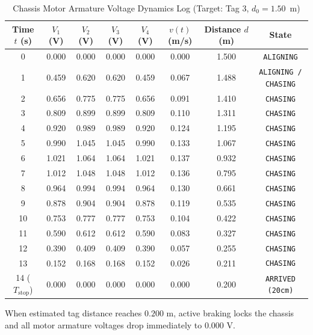\documentclass[10pt,a4paper]{article}
\begin{document}
\begin{table}[h!]
\centering
\caption{Chassis Motor Armature Voltage Dynamics Log (Target: Tag 3, $d_0 = 1.50$~m)}
\label{tab:table1}
\vspace{0.15cm}
\small
\begin{tabular}{c c c c c c c c}
\toprule
\textbf{Time $t$ (s)} & \textbf{$V_1$ (V)} & \textbf{$V_2$ (V)} & \textbf{$V_3$ (V)} & \textbf{$V_4$ (V)} & \textbf{$v(t)$ (m/s)} & \textbf{Distance $d$ (m)} & \textbf{State} \\
\midrule
0  & 0.000 & 0.000 & 0.000 & 0.000 & 0.000 & 1.500 & \texttt{ALIGNING} \\
1  & 0.459 & 0.620 & 0.620 & 0.459 & 0.067 & 1.488 & \texttt{ALIGNING / CHASING} \\
2  & 0.656 & 0.775 & 0.775 & 0.656 & 0.091 & 1.410 & \texttt{CHASING} \\
3  & 0.809 & 0.899 & 0.899 & 0.809 & 0.110 & 1.311 & \texttt{CHASING} \\
4  & 0.920 & 0.989 & 0.989 & 0.920 & 0.124 & 1.195 & \texttt{CHASING} \\
5  & 0.990 & 1.045 & 1.045 & 0.990 & 0.133 & 1.067 & \texttt{CHASING} \\
6  & 1.021 & 1.064 & 1.064 & 1.021 & 0.137 & 0.932 & \texttt{CHASING} \\
7  & 1.012 & 1.048 & 1.048 & 1.012 & 0.136 & 0.795 & \texttt{CHASING} \\
8  & 0.964 & 0.994 & 0.994 & 0.964 & 0.130 & 0.661 & \texttt{CHASING} \\
9  & 0.878 & 0.904 & 0.904 & 0.878 & 0.119 & 0.535 & \texttt{CHASING} \\
10 & 0.753 & 0.777 & 0.777 & 0.753 & 0.104 & 0.422 & \texttt{CHASING} \\
11 & 0.590 & 0.612 & 0.612 & 0.590 & 0.083 & 0.327 & \texttt{CHASING} \\
12 & 0.390 & 0.409 & 0.409 & 0.390 & 0.057 & 0.255 & \texttt{CHASING} \\
13 & 0.152 & 0.168 & 0.168 & 0.152 & 0.026 & 0.211 & \texttt{CHASING} \\
14 ($T_{\text{stop}}$) & 0.000 & 0.000 & 0.000 & 0.000 & 0.000 & 0.200 & \texttt{ARRIVED (20cm)} \\
\bottomrule
\end{tabular}
\end{table}

When estimated tag distance reaches $0.200\text{~m}$, active braking locks the chassis and all motor armature voltages drop immediately to $0.000\text{~V}$.
\end{document}
